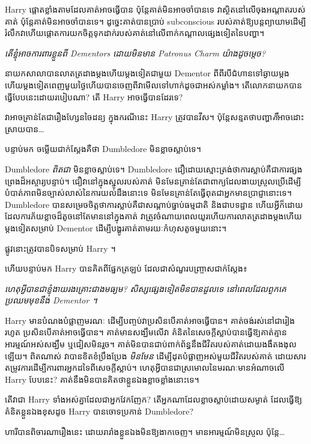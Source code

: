 {Harry ផ្តោតខ្លាំងតាមដែលគាត់អាចធ្វើបាន ប៉ុន្តែគាត់មិនអាចចាំបានទេ វាស្ថិតនៅលើចុងអណ្តាតរបស់គាត់ ប៉ុន្តែគាត់មិនអាចចាំបានទេ។ ដូច្នេះគាត់បានប្រាប់ subconscious របស់គាត់ឱ្យបន្តព្យាយាមដើម្បីរំលឹកវាហើយផ្តោតការយកចិត្តទុកដាក់របស់គាត់នៅលើពាក់កណ្តាលផ្សេងទៀតនៃបញ្ហា។

\emph{តើខ្ញុំអាចការពារខ្លួនពី Dementors ដោយមិនមាន Patronus Charm យ៉ាងដូចម្តេច?}

នាយកសាលាបានលាតត្រដាងម្តងហើយម្តងទៀតជាមួយ Dementor ពីពីរបីជំហានទៅឆ្ងាយម្តងហើយម្តងទៀតពេញមួយថ្ងៃហើយបានចេញពីវាមើលទៅហាក់ដូចជាអស់កម្លាំង។ តើ​លោក​នាយក​បាន​ធ្វើ​បែប​នេះ​ដោយ​របៀប​ណា? តើ Harry អាចធ្វើបានដែរទេ?

វាអាចគ្រាន់តែជារឿងហ្សែនចៃដន្យ ក្នុងករណីនេះ Harry ត្រូវបានវីស។ ប៉ុន្តែសន្មតថាបញ្ហា\emph{គឺ}អាចដោះស្រាយបាន…

បន្ទាប់មក ចម្លើយជាក់ស្តែងគឺថា Dumbledore មិនខ្លាចស្លាប់ទេ។

Dumbledore \emph{ពិតជា} មិនខ្លាចស្លាប់ទេ។ Dumbledore ជឿដោយស្មោះត្រង់ថាការស្លាប់គឺជាការផ្សងព្រេងដ៏អស្ចារ្យបន្ទាប់។ ជឿវានៅក្នុងស្នូលរបស់គាត់ មិនមែនគ្រាន់តែជាពាក្យដែលងាយស្រួលប្រើដើម្បីបំបាត់ភាពមិនច្បាស់លាស់នៃការយល់ដឹងនោះទេ មិនមែនគ្រាន់តែធ្វើពុតជាអ្នកមានប្រាជ្ញានោះទេ។ Dumbledore បានសម្រេចចិត្តថាការស្លាប់គឺជាសណ្តាប់ធ្នាប់ធម្មជាតិ និងជាបទដ្ឋាន ហើយអ្វីក៏ដោយដែលការភ័យខ្លាចដ៏តូចនៅតែមាននៅក្នុងគាត់ វាត្រូវចំណាយពេលយូរហើយការលាតត្រដាងម្តងហើយម្តងទៀតសម្រាប់ Dementor ដើម្បីបង្ហូរគាត់តាមរយៈកំហុសតូចមួយនោះ។

ផ្លូវនោះត្រូវបានបិទសម្រាប់ Harry ។

ហើយបន្ទាប់មក Harry បានគិតពីផ្នែកត្រឡប់ ដែលជាសំណួរបញ្ច្រាសជាក់ស្តែង៖

\emph{ហេតុអ្វីបានជាខ្ញុំងាយរងគ្រោះជាងមធ្យម? សិស្សផ្សេងទៀតមិនបានដួលទេ នៅពេលដែលពួកគេប្រឈមមុខនឹង Dementor ។}

Harry មានបំណងបំផ្លាញមរណៈ ដើម្បីបញ្ចប់វាប្រសិនបើគាត់អាចធ្វើបាន។ គាត់ចង់រស់នៅជារៀងរហូត ប្រសិនបើគាត់អាចធ្វើបាន។ គាត់មានសង្ឃឹមលើវា គំនិតនៃសេចក្តីស្លាប់បានធ្វើឱ្យគាត់គ្មានអារម្មណ៍អស់សង្ឃឹម ឬជៀសមិនរួច។ គាត់​មិន​បាន​ជាប់​ពាក់​ព័ន្ធ​នឹង​ជីវិត​របស់​គាត់​ដោយ​ងងឹត​ងងុល​ឡើយ។ ពិតណាស់ វាបានខិតខំប្រឹងប្រែង \emph{មិនមែន} ដើម្បីដុតបំផ្លាញអស់មួយជីវិតរបស់គាត់ ដោយសារតម្រូវការដើម្បីការពារអ្នកដទៃពីសេចក្តីស្លាប់។ ហេតុអ្វីបានជាស្រមោលនៃមរណៈមានអំណាចលើ Harry បែបនេះ? គាត់​នឹង​មិន​បាន​គិត​ថា​ខ្លួន​ឯង​ខ្លាច​ខ្លាំង​នោះ​ទេ។

តើវាជា Harry ទាំងអស់គ្នាដែលជាអ្នកវែកញែក? តើអ្នកណាដែលខ្លាចស្លាប់ដោយសម្ងាត់ ដែលធ្វើឱ្យគំនិតខ្លួនឯងខុសដូច Harry បានចោទប្រកាន់ Dumbledore?

ហារីបានពិចារណារឿងនេះ ដោយរារាំងខ្លួនឯងមិនឱ្យងាកចេញ។ មានអារម្មណ៍មិនស្រួល ប៉ុន្តែ…

}
